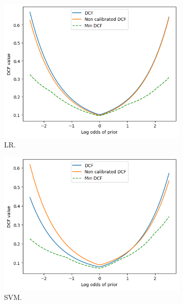 \documentclass{article}
\begin{document}
\begin{figure}[ht]
    \centering
    \begin{subfigure}[b]{0.3\textwidth}
        \centering
        \includegraphics[width=\textwidth]{images/calibration_lr_bayes_error.png}
        \caption{LR.}
    \end{subfigure}
    \hfill
    \begin{subfigure}[b]{0.3\textwidth}
        \centering
        \includegraphics[width=\textwidth]{images/calibration_svm_bayes_error.png}
        \caption{SVM.}
    \end{subfigure}
    \hfill
    \begin{subfigure}[b]{0.3\textwidth}
        \centering

\end{subfigure}
\end{figure}
\end{document}

